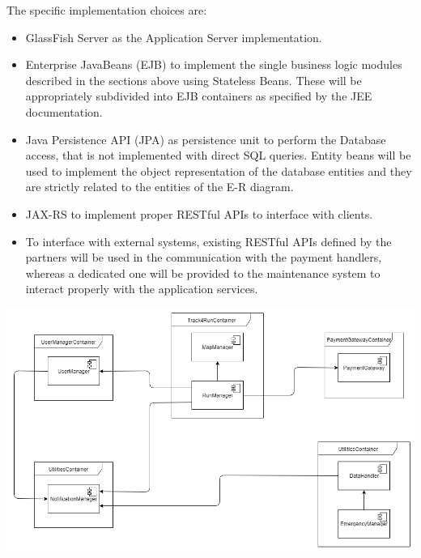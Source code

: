The specific implementation choices are:

\begin{itemize}
\item GlassFish Server as the Application Server implementation.
\item Enterprise JavaBeans (EJB) to implement the single business logic modules described in the sections above using Stateless Beans. These will be appropriately subdivided into EJB containers as specified by the JEE documentation.
\item Java Persistence API (JPA) as persistence unit to perform the Database access, that is not implemented with direct SQL queries. Entity beans will be used to implement the object representation of the database entities and they are strictly related to the entities of the E-R diagram.
\item JAX-RS to implement proper RESTful APIs to interface with clients.
\item To interface with external systems, existing RESTful APIs defined by the partners will be used in the communication with the payment handlers, whereas a dedicated one will be provided to the maintenance system to interact properly with the application services.
\end{itemize}

\begin{center}
\includegraphics[scale=0.5]{sections/diagrams/component_view.png}
\newline
{}
\end{center}

